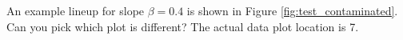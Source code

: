 \documentclass[12pt]{article}
\begin{document}

An example lineup for slope $\beta=0.4$ is shown in Figure \ref{fig:test_contaminated}.  Can you pick which plot is different? The actual data plot location is 7. 

\end{document}

